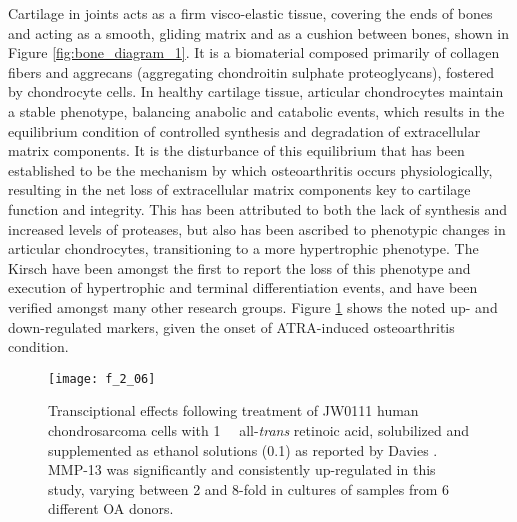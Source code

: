 \begin{refsection}
Cartilage in joints acts as a firm visco-elastic tissue, covering the ends of
bones and acting as a smooth, gliding matrix and as a cushion between bones,
shown in Figure \ref{fig:bone_diagram_1}. It is a biomaterial composed primarily
of collagen fibers and aggrecans (aggregating chondroitin sulphate
proteoglycans), fostered by chondrocyte cells. In healthy cartilage tissue,
articular chondrocytes maintain a stable phenotype, balancing anabolic and
catabolic events, which results in the equilibrium condition of controlled
synthesis and degradation of extracellular matrix components.\cite{Sandell2001}
It is the disturbance of this equilibrium that has been established to be the
mechanism by which osteoarthritis occurs physiologically, resulting in the net
loss of extracellular matrix components key to cartilage function and integrity.
This has been attributed to both the lack of synthesis and increased levels of
proteases, but also has been ascribed to phenotypic changes in articular
chondrocytes, transitioning to a more hypertrophic
phenotype.\cite{Goldring2000,VanderKraan2012} The Kirsch  have
been amongst the first to report the loss of this phenotype and execution of
hypertrophic and terminal differentiation events,\cite{Kirsch2000} and have been
verified amongst many other research
groups.\cite{Tchetina2007,Merz2003,Pfander2001,Davies2009} Figure
\ref{fig:OA_phenotype} shows the noted up- and down-regulated markers, given the
onset of ATRA-induced osteoarthritis condition.

\begin{figure}[h!] \centering \texttt{[image: f\_2\_06]}
    \caption[Transciptional effects following treatment of JW0111 human
        chondrosarcoma cells with \SI{1}{\micro\moLar} all-\emph{trans} retinoic
        acid, solubilized and supplemented as ethanol solutions
        (\SI{0.1}{\volper}) as reported by Davies . MMP-13 was
    significantly and consistently up-regulated in this study, varying between 2
and 8-fold in cultures of samples from 6 different OA donors.  ]{Transciptional
    effects following treatment of JW0111 human chondrosarcoma cells with
    \SI{1}{\micro\moLar} all-\emph{trans} retinoic acid, solubilized and
    supplemented as ethanol solutions (\SI{0.1}{\volper}) as reported by Davies
    . MMP-13 was significantly and consistently up-regulated in
    this study, varying between 2 and 8-fold in cultures of samples from 6
    different OA donors.\cite{Davies2009}}
    \label{fig:OA_phenotype} \end{figure}


\end{refsection}
